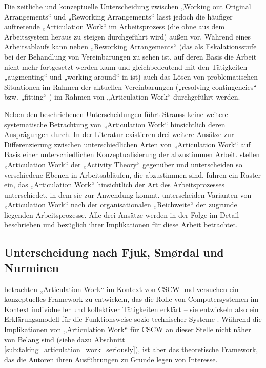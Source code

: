 Die zeitliche und konzeptuelle Unterscheidung zwischen „Working out Original Arrangements“ und „Reworking Arrangements“ lässt jedoch die häufiger auftretende „Articulation Work“ im Arbeitsprozess (die ohne aus dem Arbeitssystem heraus zu steigen durchgeführt wird) außen vor. Während eines Arbeitsablaufs kann neben „Reworking Arrangements“ (das als Eskalationsstufe bei der Behandlung von Vereinbarungen zu sehen ist, auf deren Basis die Arbeit nicht mehr fortgesetzt werden kann und gleichbedeutend mit den Tätigkeiten „augmenting“ und „working around“ in \citep{Gasser86} ist) auch das Lösen von problematischen Situationen im Rahmen der aktuellen Vereinbarungen („resolving contingencies“ \citep{Gerson86} bzw. „fitting“ \citep{Gasser86}) im Rahmen von „Articulation Work“ durchgeführt werden.

Neben den beschriebenen Unterscheidungen führt Strauss keine weitere systematische Betrachtung von „Articulation Work“ hinsichtlich deren Ausprägungen durch. In der Literatur existieren drei weitere Ansätze zur Differenzierung zwischen unterschiedlichen Arten von „Articulation Work“ auf Basis einer unterschiedlichen Konzeptualisierung der abzustimmen Arbeit. \citet{Fjuk97} stellen „Articulation Work“ der „Activity Theory“ \citep{Leontev78} gegenüber und unterscheiden so verschiedene Ebenen in Arbeitsabläufen, die abzustimmen sind. \citet{Hampson05} führen ein Raster ein, das „Articulation Work“ hinsichtlich der Art des Arbeitsprozesses unterschiedet, in dem sie zur Anwendung kommt. \citet{Faergemann05} unterscheiden Varianten von „Articulation Work“ nach der organisationalen „Reichweite“ der zugrunde liegenden Arbeitsprozesse. Alle drei Ansätze werden in der Folge im Detail beschrieben und bezüglich ihrer Implikationen für diese Arbeit betrachtet.

\subsection{Unterscheidung nach Fjuk, Smørdal und Nurminen}
\label{sub:arten_fjuk}

\citet{Fjuk97} betrachten „Articulation Work“ im Kontext von \gls{CSCW} und versuchen ein konzeptuelles Framework zu entwickeln, das die Rolle von Computersystemen im Kontext individueller und kollektiver Tätigkeiten erklärt -- sie entwickeln also ein Erklärungsmodell für die Funktionsweise sozio-technischer Systeme \citep{Emery60}. Während die Implikationen von „Articulation Work“ für \gls{CSCW} an dieser Stelle nicht näher von Belang sind (siehe dazu Abschnitt \ref{sub:taking_articulation_work_seriously}), ist aber das theoretische Framework, das die Autoren ihren Ausführungen zu Grunde legen von Interesse. 

